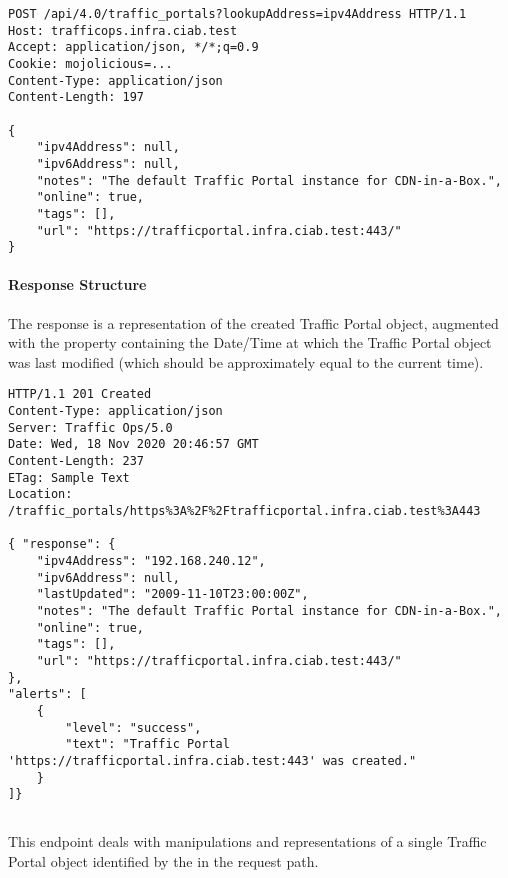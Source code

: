 \begin{codelisting}
\begin{verbatim}
POST /api/4.0/traffic_portals?lookupAddress=ipv4Address HTTP/1.1
Host: trafficops.infra.ciab.test
Accept: application/json, */*;q=0.9
Cookie: mojolicious=...
Content-Type: application/json
Content-Length: 197

{
	"ipv4Address": null,
	"ipv6Address": null,
	"notes": "The default Traffic Portal instance for CDN-in-a-Box.",
	"online": true,
	"tags": [],
	"url": "https://trafficportal.infra.ciab.test:443/"
}
\end{verbatim}
\end{codelisting}

\paragraph{Response Structure}
The response is a representation of the created Traffic Portal object, augmented
with the  property containing the Date/Time at which the
Traffic Portal object was last modified (which should be approximately equal to
the current time).

\begin{codelisting}
\begin{verbatim}
HTTP/1.1 201 Created
Content-Type: application/json
Server: Traffic Ops/5.0
Date: Wed, 18 Nov 2020 20:46:57 GMT
Content-Length: 237
ETag: Sample Text
Location: /traffic_portals/https%3A%2F%2Ftrafficportal.infra.ciab.test%3A443

{ "response": {
	"ipv4Address": "192.168.240.12",
	"ipv6Address": null,
	"lastUpdated": "2009-11-10T23:00:00Z",
	"notes": "The default Traffic Portal instance for CDN-in-a-Box.",
	"online": true,
	"tags": [],
	"url": "https://trafficportal.infra.ciab.test:443/"
},
"alerts": [
	{
		"level": "success",
		"text": "Traffic Portal 'https://trafficportal.infra.ciab.test:443' was created."
	}
]}
\end{verbatim}
\end{codelisting}

\subsection{}
This endpoint deals with manipulations and representations of a single Traffic
Portal object identified by the  in the request path.

